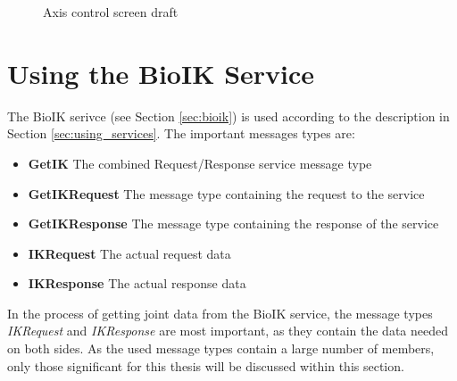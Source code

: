 \begin{figure}
	\caption{\label{fig:axiscontrol:screen}Axis control screen draft}
\end{figure}

\section{Using the BioIK Service}
\label{sec:robotarm:ctrl}

The BioIK serivce (see Section \ref{sec:bioik}) is used according to the description in Section \ref{sec:using_services}. The important messages types are:
\begin{itemize}
	\item \textbf{GetIK} The combined Request/Response service message type
	\item \textbf{GetIKRequest} The message type containing the request to the service
	\item \textbf{GetIKResponse} The message type containing the response of the service
	\item \textbf{IKRequest} The actual request data
	\item \textbf{IKResponse} The actual response data
\end{itemize}

In the process of getting joint data from the BioIK service, the message types \textit{IKRequest} and \textit{IKResponse} are most important, as they contain the data needed on both sides. As the used message types contain a large number of members, only those significant for this thesis will be discussed within this section.

